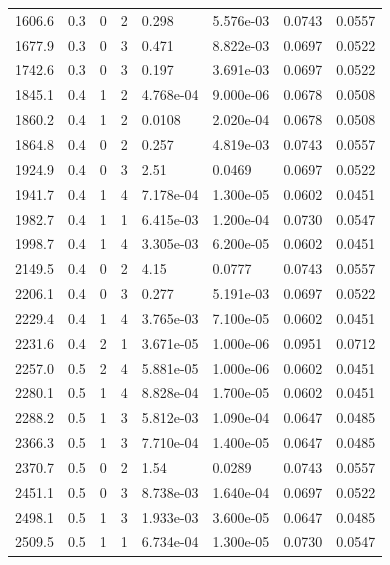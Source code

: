 \documentclass[preview]{standalone}
\begin{document}
{{{\begin{tabular}{L{1.2cm}C{1.2cm} C{0.3cm}C{0.5cm} C{1.4cm}C{1.4cm} C{1.4cm}C{1.4cm}}
  1606.6  &   0.3  & 0     &  2 &  0.298  & 5.576e-03  & 0.0743 &  0.0557   \\ 
  1677.9  &   0.3  & 0     &  3 &  0.471  & 8.822e-03  & 0.0697 &  0.0522   \\ 
  1742.6  &   0.3  & 0     &  3 &  0.197  & 3.691e-03  & 0.0697 &  0.0522   \\ 
  1845.1  &   0.4  & 1     &  2 &  4.768e-04  & 9.000e-06  & 0.0678 &  0.0508   \\ 
  1860.2  &   0.4  & 1     &  2 &  0.0108  & 2.020e-04  & 0.0678 &  0.0508   \\ 
  1864.8  &   0.4  & 0     &  2 &  0.257  & 4.819e-03  & 0.0743 &  0.0557   \\ 
  1924.9  &   0.4  & 0     &  3 &  2.51  & 0.0469  & 0.0697 &  0.0522   \\ 
  1941.7  &   0.4  & 1     &  4 &  7.178e-04  & 1.300e-05  & 0.0602 &  0.0451   \\ 
  1982.7  &   0.4  & 1     &  1 &  6.415e-03  & 1.200e-04  & 0.0730 &  0.0547   \\ 
  1998.7  &   0.4  & 1     &  4 &  3.305e-03  & 6.200e-05  & 0.0602 &  0.0451   \\ 
  2149.5  &   0.4  & 0     &  2 &  4.15  & 0.0777  & 0.0743 &  0.0557   \\ 
  2206.1  &   0.4  & 0     &  3 &  0.277  & 5.191e-03  & 0.0697 &  0.0522   \\ 
  2229.4  &   0.4  & 1     &  4 &  3.765e-03  & 7.100e-05  & 0.0602 &  0.0451   \\ 
  2231.6  &   0.4  & 2     &  1 &  3.671e-05  & 1.000e-06  & 0.0951 &  0.0712   \\ 
  2257.0  &   0.5  & 2     &  4 &  5.881e-05  & 1.000e-06  & 0.0602 &  0.0451   \\ 
  2280.1  &   0.5  & 1     &  4 &  8.828e-04  & 1.700e-05  & 0.0602 &  0.0451   \\ 
  2288.2  &   0.5  & 1     &  3 &  5.812e-03  & 1.090e-04  & 0.0647 &  0.0485   \\ 
  2366.3  &   0.5  & 1     &  3 &  7.710e-04  & 1.400e-05  & 0.0647 &  0.0485   \\ 
  2370.7  &   0.5  & 0     &  2 &  1.54  & 0.0289  & 0.0743 &  0.0557   \\ 
  2451.1  &   0.5  & 0     &  3 &  8.738e-03  & 1.640e-04  & 0.0697 &  0.0522   \\ 
  2498.1  &   0.5  & 1     &  3 &  1.933e-03  & 3.600e-05  & 0.0647 &  0.0485   \\ 
  2509.5  &   0.5  & 1     &  1 &  6.734e-04  & 1.300e-05  & 0.0730 &  0.0547   \\ 

\end{tabular}}}}
\end{document}
